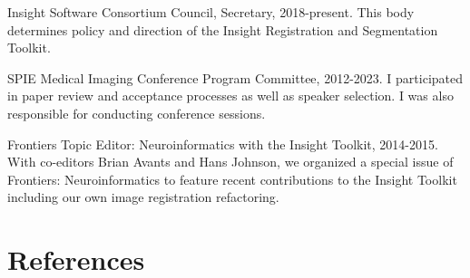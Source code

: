 \documentclass[
  11pt,
]{article}
\begin{document}
Insight Software Consortium Council, Secretary, 2018-present. This body
determines policy and direction of the Insight Registration and
Segmentation Toolkit.

SPIE Medical Imaging Conference Program Committee, 2012-2023. I
participated in paper review and acceptance processes as well as speaker
selection. I was also responsible for conducting conference sessions.

Frontiers Topic Editor: Neuroinformatics with the Insight Toolkit,
2014-2015. With co-editors Brian Avants and Hans Johnson, we organized a
special issue of Frontiers: Neuroinformatics to feature recent
contributions to the Insight Toolkit including our own image
registration refactoring.

\hypertarget{references}{%
\section*{References}\label{references}}
\end{document}
